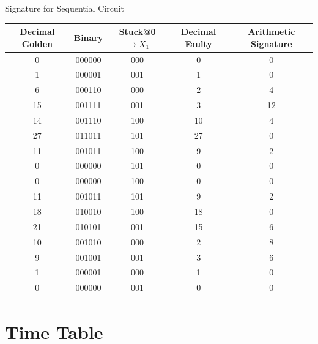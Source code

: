 \documentclass[aspectratio=1610]{beamer}
\begin{document}
\begin{frame}{Signature for Sequential Circuit}
\begin{table}[tb!]
{\begin{tabular}{|c | c| c | c| c |}
 \hline
 \rowcolor{lightgray}
Decimal Golden & Binary & Stuck@0$\rightarrow X_1$ & Decimal Faulty & Arithmetic Signature   \\ 
\hline
 
 
 0 & 000000 & 000 & 0 & 0  \\
 \hline

 1 & 000001 & 001 & 1 & 0 \\
 \hline
 
 6 & 000110 & 000 & 2 & 4 \\
 \hline
 15 & 001111 & 001 & 3 & 12 \\
 \hline
 14 & 001110 & 100 & 10 & 4 \\
 \hline
 27 & 011011 & 101 & 27 & 0 \\
 \hline
 11 & 001011 & 100 & 9 & 2 \\
 \hline
 0 & 000000 & 101 & 0 & 0 \\
 \hline
 0 & 000000 & 100 & 0 & 0 \\
 \hline
 11 & 001011 & 101 & 9 & 2 \\
 \hline
 18 & 010010 & 100 & 18 & 0 \\
 \hline
 
 21 & 010101 & 001 & 15 & 6 \\
 \hline
 10 & 001010 & 000 & 2 & 8 \\
 \hline
 9 & 001001& 001 & 3 & 6 \\
 \hline
 1 & 000001 & 000 & 1 & 0 \\
 \hline
 0 & 000000 & 001 & 0 & 0 \\
 \hline




 
 
\end{tabular}
}
\end{table}


\end{frame}

\section{Time Table}
\end{document}
